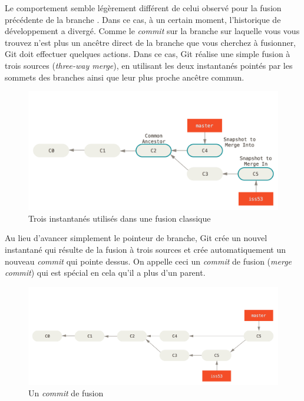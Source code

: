Le comportement semble légèrement différent de celui observé pour la fusion précédente de la branche .
Dans ce cas, à un certain moment, l'historique de développement a divergé.
Comme le \emph{commit} sur la branche sur laquelle vous vous trouvez n'est plus un ancêtre direct de la branche que vous cherchez à fusionner, Git doit effectuer quelques actions.
Dans ce cas, Git réalise une simple fusion à trois sources (\emph{three-way merge}), en utilisant les deux instantanés pointés par les sommets des branches ainsi que leur plus proche ancêtre commun.

\begin{figure}[!h]
  \centering
  \includegraphics{images/basic-merging-1}
  \caption{Trois instantanés utilisés dans une fusion classique}
  \label{fig:git:basic-merging-1}
\end{figure}

Au lieu d'avancer simplement le pointeur de branche, Git crée un nouvel instantané qui résulte de la fusion à trois sources et crée automatiquement un nouveau \emph{commit} qui pointe dessus.
On appelle ceci un \emph{commit} de fusion (\emph{merge commit}) qui est spécial en cela qu'il a plus d'un parent.

\begin{figure}[!h]
  \centering
  \includegraphics{images/basic-merging-2}
  \caption{Un \emph{commit} de fusion}
  \label{fig:git:basic-merging-2}
\end{figure}

